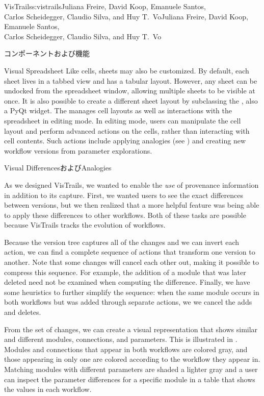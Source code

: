 \begin{aosachaptertoc}{VisTrails}{s:vistrails}{Juliana Freire, David Koop, Emanuele Santos, \\ Carlos Scheidegger, Claudio Silva, and Huy T.\ Vo}{Juliana Freire, David Koop, Emanuele Santos, \\ \hspace*{0.9cm} Carlos Scheidegger, Claudio Silva, and Huy T.\ Vo}
\begin{aosasect1}{コンポーネントおよび機能}
\begin{aosasect2}{Visual Spreadsheet}
Like cells, sheets may also be customized. By default, each sheet
lives in a tabbed view and has a tabular layout.  However, any sheet
can be undocked from the spreadsheet window, allowing multiple sheets
to be visible at once.  It is also possible to create a different
sheet layout by subclassing the , also a
PyQt widget. The  manages cell layouts as
well as interactions with the spreadsheet in editing mode. In editing
mode, users can manipulate the cell layout and perform advanced
actions on the cells, rather than interacting with cell contents.  Such
actions include applying analogies (see
) and creating new workflow versions
from parameter explorations.

\end{aosasect2}

\begin{aosasect2}{Visual DifferencesおよびAnalogies}
\label{sec.vistrails.diff}

As we designed VisTrails, we wanted to enable the \emph{use} of
provenance information in addition to its capture.  First, we wanted
users to see the exact differences between versions, but we then realized that
a more helpful feature was being able to apply these differences to other
workflows.  Both of these tasks are possible because VisTrails tracks
the evolution of workflows.

Because the version tree captures all of the changes and we can invert
each action, we can find a complete sequence of actions that transform one
version to another.  Note that some changes will cancel each other
out, making it possible to compress this sequence. For example, the
addition of a module that was later deleted need not be examined when
computing the difference.  Finally, we have some heuristics to further
simplify the sequence: when the same module occurs in both workflows
but was added through separate actions, we we cancel the adds and
deletes.

From the set of changes, we can create a visual representation
that shows similar and different modules, connections, and parameters.
This is illustrated in 
. Modules and connections that
appear in both workflows are colored gray, and those appearing in only
one are colored according to the workflow they appear in.  Matching
modules with different parameters are shaded a lighter gray and a user
can inspect the parameter differences for a specific module in a table
that shows the values in each workflow.


\end{aosasect2}
\end{aosasect1}
\end{aosachaptertoc}
